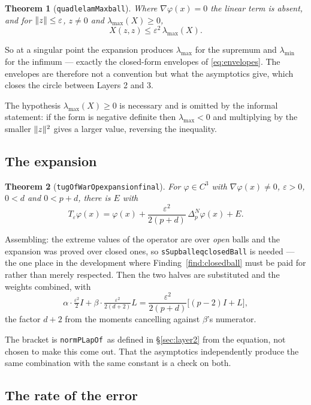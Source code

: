 \documentclass[11pt,reqno]{amsart}
\newcommand{\LEANREF}[1]{\texttt{\small\def\_{\textunderscore\allowbreak}#1}}
\newcommand{\normPLapOfName}{\LEANREF{normPLapOf}}
\newcommand{\eps}{\varepsilon}
\newcommand{\pnlap}{\Delta_p^{N}}
\newcommand{\Op}{T_\eps}
\DeclarePairedDelimiter{\norm}{\lVert}{\rVert}
\theoremstyle{plain}
\newtheorem{theorem}{Theorem}[section]
\theoremstyle{definition}
\begin{document}
\begin{theorem}[\LEANREF{quad\_le\_lamMax\_ball}]\label{thm:singexp}
Where $\nabla\varphi(x) = 0$ the linear term is absent, and for
$\norm{z} \le \eps$, $z \ne 0$ and $\lambda_{\max}(X) \ge 0$,
\[
  X(z,z) \le \eps^2\,\lambda_{\max}(X) .
\]
\end{theorem}

So at a singular point the expansion produces $\lambda_{\max}$ for the
supremum and $\lambda_{\min}$ for the infimum --- exactly the closed-form
envelopes of \eqref{eq:envelopes}. The envelopes are therefore not a
convention but what the asymptotics give, which closes the circle between
Layers 2 and 3.

The hypothesis $\lambda_{\max}(X) \ge 0$ is necessary and is omitted by the
informal statement: if the form is negative definite then $\lambda_{\max} < 0$
and multiplying by the smaller $\norm{z}^2$ gives a larger value, reversing
the inequality.

\subsection{The expansion}

\begin{theorem}[\LEANREF{tugOfWarOp\_expansion\_final}]\label{thm:opexp}
For $\varphi \in C^3$ with $\nabla\varphi(x) \ne 0$, $\eps > 0$, $0 < d$ and
$0 < p + d$, there is $E$ with
\[
  \Op\varphi(x) = \varphi(x)
    + \frac{\eps^2}{2(p+d)}\,\pnlap\varphi(x) + E .
\]
\end{theorem}

Assembling: the extreme values of the operator are over \emph{open} balls and
the expansion was proved over closed ones, so
\LEANREF{sSup\_ball\_eq\_closedBall} is needed --- the one place in the
development where Finding~\ref{find:closedball} must be paid for rather than
merely respected. Then the two halves are substituted and the weights
combined, with
\[
  \alpha \cdot \tfrac{\eps^2}{2} I
    + \beta \cdot \tfrac{\eps^2}{2(d+2)} L
  = \frac{\eps^2}{2(p+d)}\bigl[(p-2) I + L\bigr] ,
\]
the factor $d+2$ from the moments cancelling against $\beta$'s numerator.

The bracket is \normPLapOfName\ as defined in \S\ref{sec:layer2} from the
equation, not chosen to make this come out. That the asymptotics
independently produce the same combination with the same constant is a check
on both.

\subsection{The rate of the error}\label{ssec:rate}
\end{document}
